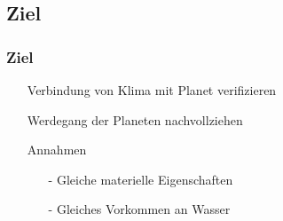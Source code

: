 \documentclass{beamer}
\begin{document}
\begin{frame}
%	

\end{frame}

\subsection{Ziel}
\begin{frame}
\frametitle{Ziel}
\begin{itemize}

	\item[] Verbindung von Klima mit Planet verifizieren
	\item[] Werdegang der Planeten nachvollziehen
	\item[] Annahmen
	\begin{itemize}
	\item[-] Gleiche materielle Eigenschaften
	\item[-] Gleiches Vorkommen an Wasser 
	\end{itemize}
\end{itemize}
\end{frame}
\end{document}
